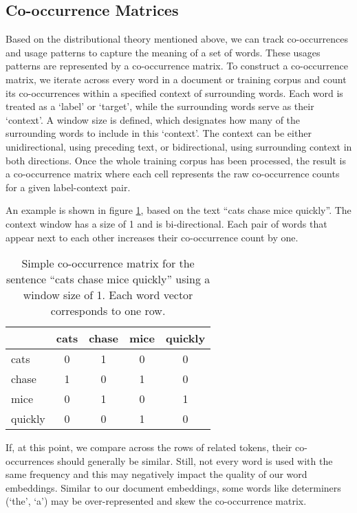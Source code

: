 \subsection{Co-occurrence Matrices}

Based on the distributional theory mentioned above, we can track co-occurrences and usage patterns to capture the meaning of a set of words. These usages patterns are represented by a co-occurrence matrix. To construct a co-occurrence matrix, we iterate across every word in a document or training corpus and count its co-occurrences within a specified context of surrounding words. Each word is treated as a `label' or `target', while the surrounding words serve as their `context'. A window size is defined, which designates how many of the surrounding words to include in this `context'. The context can be either unidirectional, using  preceding text, or bidirectional, using surrounding context in both directions. Once the whole training corpus has been processed, the result is a co-occurrence matrix where each cell represents the raw co-occurrence counts for a given label-context pair. 

An example is shown in figure \ref{simpleCoocmatrix}, based on the text ``cats chase mice quickly''.  The context window has a size of 1 and is bi-directional. Each pair of words that appear next to each other increases their co-occurrence count by one.

\begin{table}[h]
    \centering
    \begin{tabular}{|l|c|c|c|c|}
    \hline
     & cats & chase & mice & quickly \\
    \hline
    cats & 0 & 1 & 0 & 0 \\
    \hline
    chase & 1 & 0 & 1 & 0 \\
    \hline
    mice & 0 & 1 & 0 & 1 \\
    \hline
    quickly & 0 & 0 & 1 & 0 \\
    \hline
    \end{tabular}
    \caption{Simple co-occurrence matrix for the sentence ``cats chase mice quickly'' using a window size of 1. Each word vector corresponds to one row.}
    \label{simpleCoocmatrix}
\end{table}


If, at this point, we compare across the rows of related tokens, their co-occurrences should generally be similar. Still, not every word is used with the same frequency and this may negatively impact the quality of our word embeddings. Similar to our document embeddings, some words like determiners (`the', `a') may be over-represented and skew the co-occurrence matrix. 

